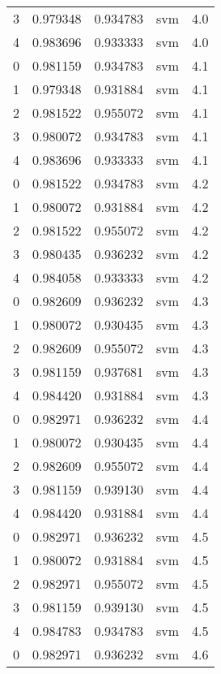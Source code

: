 \begin{tabular}{rrrlr}
     3 & 0.979348 & 0.934783 &      svm &        4.0 \\
     4 & 0.983696 & 0.933333 &      svm &        4.0 \\
     0 & 0.981159 & 0.934783 &      svm &        4.1 \\
     1 & 0.979348 & 0.931884 &      svm &        4.1 \\
     2 & 0.981522 & 0.955072 &      svm &        4.1 \\
     3 & 0.980072 & 0.934783 &      svm &        4.1 \\
     4 & 0.983696 & 0.933333 &      svm &        4.1 \\
     0 & 0.981522 & 0.934783 &      svm &        4.2 \\
     1 & 0.980072 & 0.931884 &      svm &        4.2 \\
     2 & 0.981522 & 0.955072 &      svm &        4.2 \\
     3 & 0.980435 & 0.936232 &      svm &        4.2 \\
     4 & 0.984058 & 0.933333 &      svm &        4.2 \\
     0 & 0.982609 & 0.936232 &      svm &        4.3 \\
     1 & 0.980072 & 0.930435 &      svm &        4.3 \\
     2 & 0.982609 & 0.955072 &      svm &        4.3 \\
     3 & 0.981159 & 0.937681 &      svm &        4.3 \\
     4 & 0.984420 & 0.931884 &      svm &        4.3 \\
     0 & 0.982971 & 0.936232 &      svm &        4.4 \\
     1 & 0.980072 & 0.930435 &      svm &        4.4 \\
     2 & 0.982609 & 0.955072 &      svm &        4.4 \\
     3 & 0.981159 & 0.939130 &      svm &        4.4 \\
     4 & 0.984420 & 0.931884 &      svm &        4.4 \\
     0 & 0.982971 & 0.936232 &      svm &        4.5 \\
     1 & 0.980072 & 0.931884 &      svm &        4.5 \\
     2 & 0.982971 & 0.955072 &      svm &        4.5 \\
     3 & 0.981159 & 0.939130 &      svm &        4.5 \\
     4 & 0.984783 & 0.934783 &      svm &        4.5 \\
     0 & 0.982971 & 0.936232 &      svm &        4.6 \\

\end{tabular}
